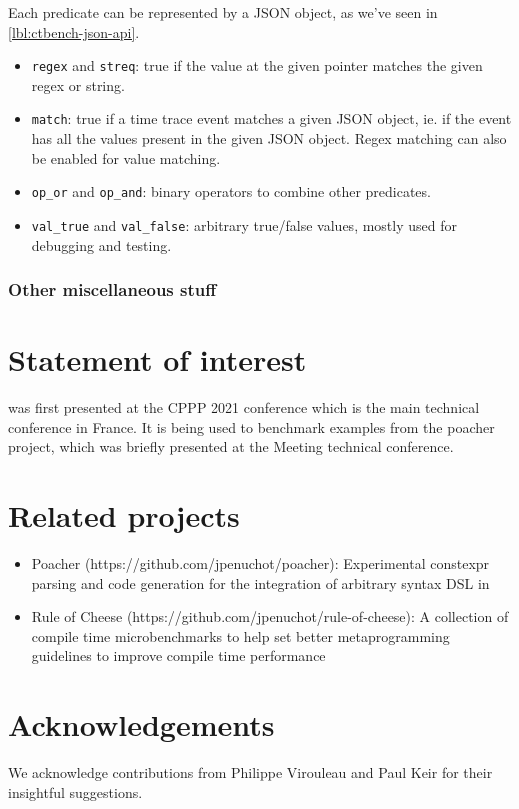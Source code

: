 \documentclass[../../main.tex]{subfiles}
\begin{document}
Each predicate can be represented by a JSON object, as we've seen in
\ref{lbl:ctbench-json-api}.

\begin{itemize}
\item \lstinline{regex} and \lstinline{streq}: true if the value at the given
      pointer matches the given regex or string.
\item \lstinline{match}: true if a time trace event matches a given JSON object,
      ie. if the event has all the values present in the given JSON object.
      Regex matching can also be enabled for value matching.
\item \lstinline{op_or} and \lstinline{op_and}: binary operators to combine
      other predicates.
\item \lstinline{val_true} and \lstinline{val_false}: arbitrary true/false
      values, mostly used for debugging and testing.
\end{itemize}

\subsubsection{Other miscellaneous stuff}



\section{Statement of interest} %

\ctbench was first presented at the CPPP 2021 conference\cite{ctbench-cppp21}
which is the main \cpp technical conference in France. It is being used to
benchmark examples from the poacher\cite{poacher} project, which was briefly
presented at the Meeting \cite{meetingcpp22} technical conference.

\section{Related projects} %

\begin{itemize}

\item Poacher (https://github.com/jpenuchot/poacher): Experimental constexpr
      parsing and code generation for the integration of arbitrary syntax DSL in

\item Rule of Cheese (https://github.com/jpenuchot/rule-of-cheese):
      A collection of compile time microbenchmarks to help set better
      \cpp metaprogramming guidelines to improve compile time performance
\end{itemize}

\section{Acknowledgements}

We acknowledge contributions from Philippe Virouleau and Paul Keir for their
insightful suggestions.
\end{document}
